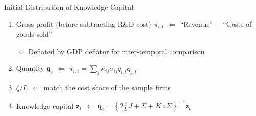 \documentclass[english,aspectratio=169,handout]{beamer}
\theoremstyle{plain}
\begin{document}
%
\begin{frame}{Initial Distribution of Knowledge Capital}
  \begin{enumerate}
    \item Gross profit (before subtracting R\&D cost) $\pi_{i,t}$ $\Longleftarrow$
          ``Revenue'' $-$ ``Costs of goods sold''
          \begin{itemize}
            \item Deflated by GDP deflator for inter-temporal comparison\medskip{}
          \end{itemize}
    \item Quantity $\mathbf{q}_{t}$ $\Longleftarrow$ $\pi_{i,t}=\sum_{j}\kappa_{ij}\sigma_{ij}q_{i,t}q_{j,t}$\medskip{}
    \item $\zeta/L$ $\Longleftarrow$ match the cost share of the sample firms\medskip{}
    \item Knowledge capital $\mathbf{z}_{t}$ $\Longleftarrow$ $\mathbf{q}_{t}=\left\{ 2\frac{\zeta}{L}J+\Sigma+K\circ\Sigma\right\} ^{-1}\mathbf{z}_{t}$
  \end{enumerate}
\end{frame}
%
\end{document}
